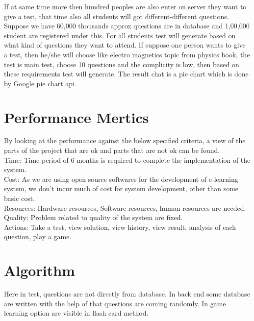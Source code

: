 If at same time more then hundred peoples are also enter on server they want to give a test, that time also all students will got different-different questions. Suppose we have 60,000 thousands approx questions are in database and 1,00,000 student are registered under this. For all students test will generate based on what kind of questions they want to attend. If suppose one person wants to give a test, then he/she will choose like electro magnetics topic from physics book, the test is main test, choose 10 questions and the complicity is low, then based on these requirements test will generate. The result chat is a pie chart which is done by Google pie chart api.
\section{Performance Mertics}
By looking at the performance against the below specified criteria, a view of the parts of the project that are ok and parts that are not ok can be found.\\[0.5cm]
Time: Time period of 6 months is required to complete the implementation of the system.\\[0.5cm]
Cost: As we are using open source softwares for the development of e-learning system, we don't incur much of cost for system development, other than some basic cost.\\[0.5cm]
Resources: Hardware resources, Software resources, human resources are needed.\\[0.5cm]
Quality: Problem related to quality of the system are fixed.\\[0.5cm]
Actions: Take a test, view solution, view history, view result, analysis of each question, play a game.
\section{Algorithm}
Here in test, questions are not directly from database. In back end some database are written with the help of that questions are coming randomly. In game learning option are visible in flash card method.\\

